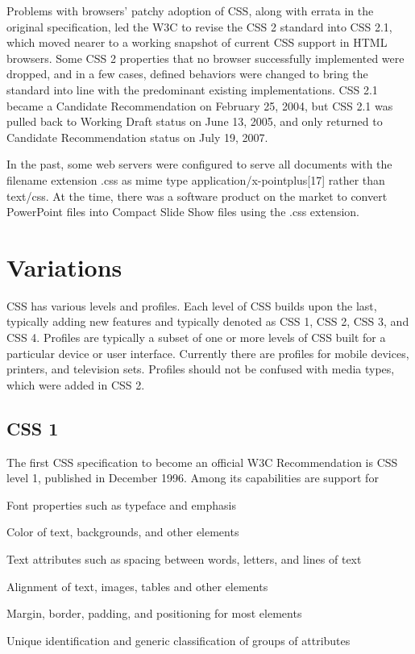 Problems with browsers' patchy adoption of CSS, along with errata in the original specification, led the W3C to revise the CSS 2 standard into CSS 2.1, which moved nearer to a working snapshot of current CSS support in HTML browsers. Some CSS 2 properties that no browser successfully implemented were dropped, and in a few cases, defined behaviors were changed to bring the standard into line with the predominant existing implementations. CSS 2.1 became a Candidate Recommendation on February 25, 2004, but CSS 2.1 was pulled back to Working Draft status on June 13, 2005, and only returned to Candidate Recommendation status on July 19, 2007.


In the past, some web servers were configured to serve all documents with the filename extension .css as mime type application/x-pointplus[17] rather than text/css. At the time, there was a software product on the market to convert PowerPoint files into Compact Slide Show files using the .css extension.




\section{Variations}


CSS has various levels and profiles. Each level of CSS builds upon the last, typically adding new features and typically denoted as CSS 1, CSS 2, CSS 3, and CSS 4. Profiles are typically a subset of one or more levels of CSS built for a particular device or user interface. Currently there are profiles for mobile devices, printers, and television sets. Profiles should not be confused with media types, which were added in CSS 2.




\subsection{CSS 1}

The first CSS specification to become an official W3C Recommendation is CSS level 1, published in December 1996. Among its capabilities are support for

\begin{compactitem}
\item  Font properties such as typeface and emphasis
\item Color of text, backgrounds, and other elements
\item Text attributes such as spacing between words, letters, and lines of text
\item Alignment of text, images, tables and other elements
\item Margin, border, padding, and positioning for most elements
\item Unique identification and generic classification of groups of attributes
\end{compactitem}

